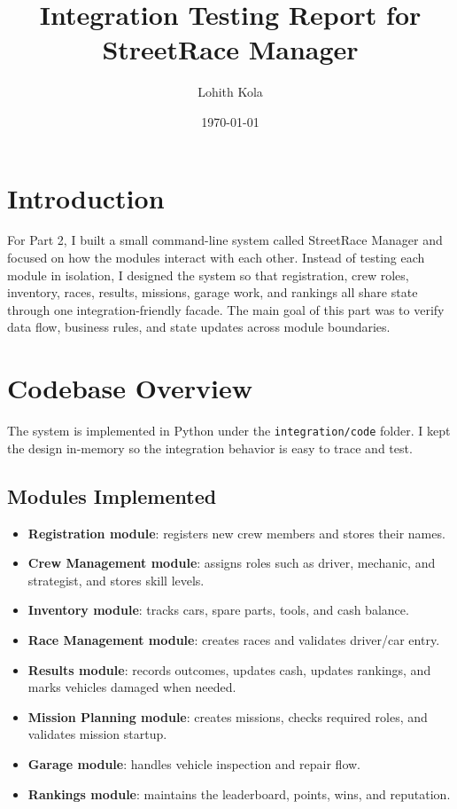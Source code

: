 \documentclass[12pt]{article}
\title{Integration Testing Report for StreetRace Manager}
\author{Lohith Kola}
\date{\today}
\begin{document}
\maketitle

\section{Introduction}
For Part 2, I built a small command-line system called StreetRace Manager and focused on how the modules interact with each other. Instead of testing each module in isolation, I designed the system so that registration, crew roles, inventory, races, results, missions, garage work, and rankings all share state through one integration-friendly facade. The main goal of this part was to verify data flow, business rules, and state updates across module boundaries.

\section{Codebase Overview}
The system is implemented in Python under the \texttt{integration/code} folder. I kept the design in-memory so the integration behavior is easy to trace and test.

\subsection{Modules Implemented}
\begin{itemize}
  \item \textbf{Registration module}: registers new crew members and stores their names.
  \item \textbf{Crew Management module}: assigns roles such as driver, mechanic, and strategist, and stores skill levels.
  \item \textbf{Inventory module}: tracks cars, spare parts, tools, and cash balance.
  \item \textbf{Race Management module}: creates races and validates driver/car entry.
  \item \textbf{Results module}: records outcomes, updates cash, updates rankings, and marks vehicles damaged when needed.
  \item \textbf{Mission Planning module}: creates missions, checks required roles, and validates mission startup.
  \item \textbf{Garage module}: handles vehicle inspection and repair flow.
  \item \textbf{Rankings module}: maintains the leaderboard, points, wins, and reputation.
\end{itemize}
\end{document}
